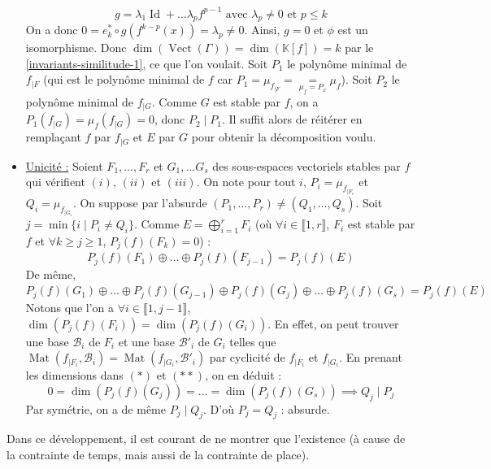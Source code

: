 \begin{demonstration}
\begin{itemize}
			\[ g = \lambda_1 \operatorname{Id} + \dots \lambda_p f^{p-1} \text{ avec } \lambda_p \neq 0 \text{ et } p \leq k \]
			On a donc $0 = e_k^* \circ g(f^{k-p} (x)) = \lambda_p \neq 0$. Ainsi, $g = 0$ et $\phi$ est un isomorphisme. Donc $\dim(\operatorname{Vect}(\Gamma)) = \dim(\mathbb{K}[f]) = k$ par le \cref{invariants-similitude-1}, ce que l'on voulait.
			\newpar
			Soit $P_1$ le polynôme minimal de $f_{|F}$ (qui est le polynôme minimal de $f$ car $P_1 = \mu_{f_{|F}} = \underset{\mu_f = P_x}{=} \mu_f$). Soit $P_2$ le polynôme minimal de $f_{|G}$. Comme $G$ est stable par $f$, on a $P_1(f_{|G}) = \mu_f(f_{|G}) = 0$, donc $P_2 \mid P_1$. Il suffit alors de réitérer en remplaçant $f$ par $f_{|G}$ et $E$ par $G$ pour obtenir la décomposition voulu.
			\item \underline{Unicité :} Soient $F_1, \dots, F_r$ et $G_1, \dots G_s$ des sous-espaces vectoriels stables par $f$ qui vérifient $(i)$, $(ii)$ et $(iii)$. On note pour tout $i$, $P_i = \mu_{f_{|F_i}}$ et $Q_i = \mu_{f_{|G_i}}$. On suppose par l'absurde $(P_1, \dots, P_r) \neq (Q_1, \dots, Q_s)$. Soit $j = \min\{ i \mid P_i \neq Q_i \}$.
			Comme $E = \bigoplus_{i = 1}^r F_i$ (où $\forall i \in \llbracket 1, r \rrbracket$, $F_i$ est stable par $f$ et $\forall k \geq j \geq 1$, $P_j(f)(F_k) = 0$) :
			\[ P_j(f)(F_1) \oplus \dots \oplus P_j(f)(F_{j-1}) = P_j(f)(E) \tag{$*$} \]
			De même,
			\[ P_j(f)(G_1) \oplus \dots \oplus P_j(f)(G_{j-1}) \oplus P_j(f)(G_j) \oplus \dots \oplus P_j(f)(G_s) = P_j(f)(E) \tag{$**$} \]
			Notons que l'on a $\forall i \in \llbracket 1, j-1 \rrbracket$, $\dim(P_j(f)(F_i)) = \dim(P_j(f)(G_i))$. En effet, on peut trouver une base $\mathcal{B}_i$ de $F_i$ et une base $\mathcal{B}'_i$ de $G_i$ telles que $\operatorname{Mat}(f_{|F_i}, \mathcal{B}_i) = \operatorname{Mat}(f_{|G_i}, \mathcal{B}'_i)$ par cyclicité de $f_{|F_i}$ et $f_{|G_i}$. En prenant les dimensions dans $(*)$ et $(**)$, on en déduit :
			\[ 0 = \dim(P_j(f)(G_j)) = \dots = \dim(P_j(f)(G_s)) \implies Q_j \mid P_j \]
			Par symétrie, on a de même $P_j \mid Q_j$. D'où $P_j = Q_j$ : absurde.
		\end{itemize}
	\end{demonstration}

	\begin{remark}
		Dans ce développement, il est courant de ne montrer que l'existence (à cause de la contrainte de temps, mais aussi de la contrainte de place).
	\end{remark}

